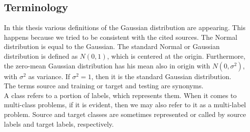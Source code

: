 \subsection{Terminology}
In this thesis various definitions of the Gaussian distribution are appearing.
This happens because we tried to be consistent with the cited sources.
The Normal distribution is equal to the Gaussian.
The standard Normal or Gaussian distribution is defined as $N(0,1)$, which is centered at the origin.
Furthermore, the zero-mean Gaussian distribution has his mean also in origin with $N(0,\sigma^2)$, with $\sigma^2$ as variance.
If $\sigma^2=1$, then it is the standard Gaussian distribution.\\
The terms source and training or target and testing are synonyms.\\
A class refers to a portion of labels, which represents them. 
When it comes to multi-class problems, if it is evident, then we may also refer to it as a multi-label problem.
Source and target classes are sometimes represented or called by source labels and target labels, respectively.
\clearpage
\newpage
